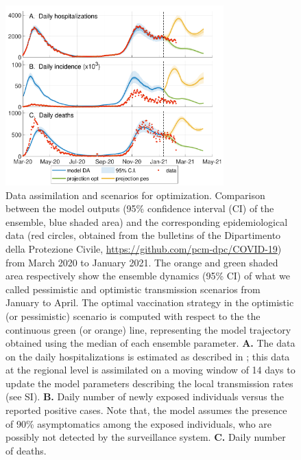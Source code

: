 \begin{figure}[!ht]
    \centering
    \includegraphics[width=0.75\textwidth]{fig_italy-ocp/figures/DA_italy1.pdf}
    \caption[Data assimilation and scenarios for optimization]{Data assimilation and scenarios for optimization. Comparison between the model outputs (95\% confidence interval (CI) of the ensemble, blue shaded area) and the corresponding epidemiological data (red circles, obtained from the bulletins of the Dipartimento della Protezione Civile, {\url{https://github.com/pcm-dpc/COVID-19}}) from March 2020 to January 2021. The orange and green shaded area respectively show the ensemble dynamics (95\% CI) of what we called pessimistic and optimistic transmission scenarios from January to April. The optimal vaccination strategy in the optimistic (or pessimistic) scenario is computed with respect to the the continuous green (or orange) line, representing the model trajectory obtained using the median of each ensemble parameter. \textbf{A.} The data on the daily hospitalizations is estimated as described in \parencite{Bertuzzo:GeographyCOVID19Spread:2020}; this data at the regional level is assimilated on a moving window of 14 days to update the model parameters describing the local transmission rates (see SI). 
    \textbf{B.} Daily number of newly exposed individuals versus the reported positive cases. Note that, the model assumes the presence of 90\% asymptomatics among the exposed individuals, who are possibly not detected by the surveillance system. \textbf{C.} Daily number of deaths. %
    }\label{fig:model_DA}
\end{figure}


